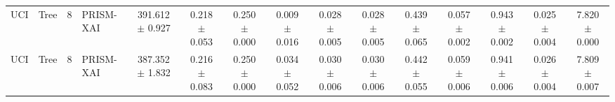 \begin{table}[t]
\begin{tabular}{llllccccccccccc}
UCI & Tree & 8 & PRISM-XAI & 391.612 $\pm$ 0.927 & 0.218 $\pm$ 0.053 & 0.250 $\pm$ 0.000 & 0.009 $\pm$ 0.016 & 0.028 $\pm$ 0.005 & 0.028 $\pm$ 0.005 & 0.439 $\pm$ 0.065 & 0.057 $\pm$ 0.002 & 0.943 $\pm$ 0.002 & 0.025 $\pm$ 0.004 & 7.820 $\pm$ 0.000 \\
UCI & Tree & 8 & PRISM-XAI & 387.352 $\pm$ 1.832 & 0.216 $\pm$ 0.083 & 0.250 $\pm$ 0.000 & 0.034 $\pm$ 0.052 & 0.030 $\pm$ 0.006 & 0.030 $\pm$ 0.006 & 0.442 $\pm$ 0.055 & 0.059 $\pm$ 0.006 & 0.941 $\pm$ 0.006 & 0.026 $\pm$ 0.004 & 7.809 $\pm$ 0.007 \\
\bottomrule
\end{tabular}
\end{table}
